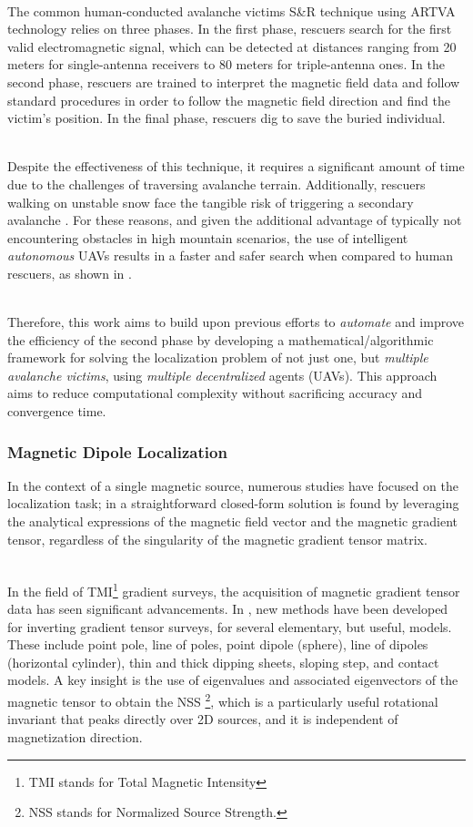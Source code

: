 \documentclass[main]{subfiles}
\begin{document}
\noindent\\The common human-conducted avalanche victims S\&R technique using ARTVA 
technology relies on three phases. In the first phase, rescuers search for the 
first valid electromagnetic signal, which can be detected at distances ranging 
from 20 meters for single-antenna receivers to 80 meters for triple-antenna ones. 
In the second phase, rescuers are trained to interpret the magnetic field data 
and follow standard procedures in order to follow the magnetic field direction and 
find the victim's position. In the final phase, rescuers dig to save the buried 
individual.

\noindent\\Despite the effectiveness of this technique, it requires a significant amount of 
time due to the challenges of traversing avalanche terrain. Additionally, 
rescuers walking on unstable snow face the tangible risk of triggering a 
secondary avalanche \cite{first-model}. For these reasons, and given the 
additional advantage of typically not encountering obstacles in high mountain 
scenarios, the use of intelligent \textit{autonomous} UAVs results in a faster 
and safer search when compared to human rescuers, as shown in \cite{sr, sr2, sr3}.

\noindent\\Therefore, this work aims to build upon previous efforts to 
\textit{automate} and improve the efficiency of the second phase by developing a 
mathematical/algorithmic framework for solving the localization problem of not 
just one, but \textit{multiple avalanche victims}, using \textit{multiple 
decentralized} agents (UAVs). This approach aims to reduce computational 
complexity without sacrificing accuracy and convergence time.

\subsubsection{Magnetic Dipole Localization}
In the context of a single magnetic source, numerous studies have focused 
on the localization task; in \cite{single_closed_formula_position} 
a straightforward closed-form solution is found by leveraging the analytical 
expressions of the magnetic field vector and the magnetic gradient tensor, 
regardless of the singularity of the magnetic gradient tensor matrix.

\noindent\\In the field of TMI\footnote{TMI stands for Total Magnetic Intensity} 
gradient surveys, the acquisition of magnetic gradient tensor data 
has seen significant advancements.
In \cite{NSS_analysis2}, new methods have been 
developed for inverting gradient tensor surveys, 
for several elementary, but useful, models. 
These include point pole, line 
of poles, point dipole (sphere), line of dipoles (horizontal cylinder), thin and thick 
dipping sheets, sloping step, and contact models.
A key insight is the use of eigenvalues and associated eigenvectors of the magnetic
tensor to obtain the NSS \footnote{NSS stands for Normalized Source Strength.},
which is a particularly useful rotational invariant that peaks 
directly over 2D sources, and it is independent of magnetization 
direction.
\end{document}

